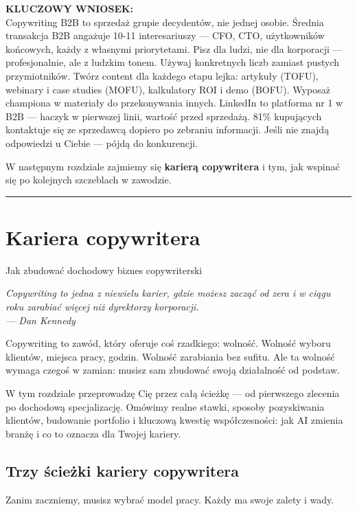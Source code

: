 \documentclass[
  12pt,
  a4paper,
  twoside,
  openright,
  12pt,
  DIV=12,
  BCOR=12mm]{scrbook}
\newcommand{\chapteropener}[1]{%
  \begin{center}
    \large\itshape\color{textmuted}#1
  \end{center}
  \vspace{1em}
}
\newcommand{\decoline}{%
  \begin{center}
    \textcolor{bordergray}{\rule{0.3\textwidth}{0.5pt}}
  \end{center}
}
\newcommand{\takeaway}[1]{%
  \begin{tcolorbox}[
    enhanced,
    colback=accentgreen!10,
    colframe=accentgreen,
    boxrule=0pt,
    borderline south={3pt}{0pt}{accentgreen},
    sharp corners,
    left=15pt, right=15pt, top=10pt, bottom=10pt
  ]
    \textbf{\color{accentgreen}KLUCZOWY WNIOSEK:}\\[5pt]
    #1
  \end{tcolorbox}
}
\begin{document}
\takeaway{Copywriting B2B to sprzedaż grupie decydentów, nie jednej osobie. Średnia transakcja B2B angażuje 10-11 interesariuszy --- CFO, CTO, użytkowników końcowych, każdy z własnymi priorytetami. Pisz dla ludzi, nie dla korporacji --- profesjonalnie, ale z ludzkim tonem. Używaj konkretnych liczb zamiast pustych przymiotników. Twórz content dla każdego etapu lejka: artykuły (TOFU), webinary i case studies (MOFU), kalkulatory ROI i demo (BOFU). Wyposaż championa w materiały do przekonywania innych. LinkedIn to platforma nr 1 w B2B --- haczyk w pierwszej linii, wartość przed sprzedażą. 81\% kupujących kontaktuje się ze sprzedawcą dopiero po zebraniu informacji. Jeśli nie znajdą odpowiedzi u Ciebie --- pójdą do konkurencji.}

W następnym rozdziale zajmiemy się \textbf{karierą copywritera} i tym,
jak wspinać się po kolejnych szczeblach w zawodzie.

\decoline


\chapter{Kariera copywritera}\label{kariera-copywritera}

Jak zbudować dochodowy biznes copywriterski

\hfill\break

\chapteropener{Copywriting to jedna z niewielu karier, gdzie możesz zacząć od zera i w ciągu roku zarabiać więcej niż dyrektorzy korporacji.\\--- Dan Kennedy}

Copywriting to zawód, który oferuje coś rzadkiego: wolność. Wolność
wyboru klientów, miejsca pracy, godzin. Wolność zarabiania bez sufitu.
Ale ta wolność wymaga czegoś w zamian: musisz sam zbudować swoją
działalność od podstaw.

W tym rozdziale przeprowadzę Cię przez całą ścieżkę --- od pierwszego
zlecenia po dochodową specjalizację. Omówimy realne stawki, sposoby
pozyskiwania klientów, budowanie portfolio i kluczową kwestię
współczesności: jak AI zmienia branżę i co to oznacza dla Twojej
kariery.

\section{Trzy ścieżki kariery
copywritera}\label{trzy-ux15bcieux17cki-kariery-copywritera}

Zanim zaczniemy, musisz wybrać model pracy. Każdy ma swoje zalety i
wady.
\end{document}
